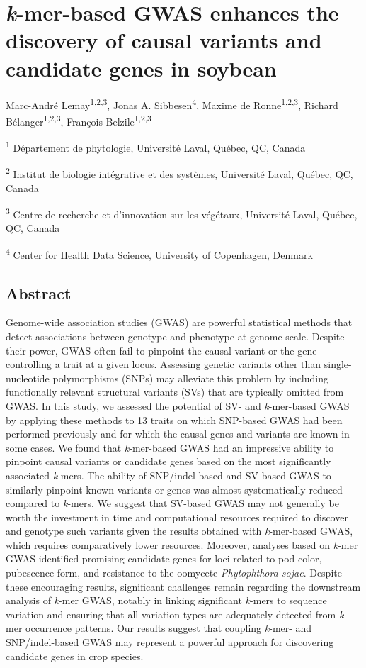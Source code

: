 \chapter{\textit{k}-mer-based GWAS enhances the discovery of causal variants and candidate genes in soybean}
\label{kmer-gwas}

Marc-André Lemay\textsuperscript{1,2,3},
Jonas A. Sibbesen\textsuperscript{4},
Maxime de Ronne\textsuperscript{1,2,3},
Richard Bélanger\textsuperscript{1,2,3},
François Belzile\textsuperscript{1,2,3}

\textsuperscript{1} Département de phytologie, Université Laval, Québec, QC, Canada

\textsuperscript{2} Institut de biologie intégrative et des systèmes, Université Laval, Québec, QC, Canada

\textsuperscript{3} Centre de recherche et d’innovation sur les végétaux, Université Laval, Québec, QC, Canada

\textsuperscript{4} Center for Health Data Science, University of Copenhagen, Denmark

\clearpage

\section{Abstract}

Genome-wide association studies (GWAS) are powerful statistical methods
that detect associations between genotype and phenotype at genome scale. Despite
their power, GWAS often fail to pinpoint the causal variant or the gene
controlling a trait at a given locus.  Assessing genetic variants other
than single-nucleotide polymorphisms (SNPs) may alleviate this problem
by including functionally relevant structural variants (SVs) that are
typically omitted from GWAS.  In this study, we assessed the potential
of SV- and \emph{k}-mer-based GWAS by applying these methods to 13
traits on which SNP-based GWAS had been performed previously and for
which the causal genes and variants are known in some cases. We found
that \emph{k}-mer-based GWAS had an impressive ability to pinpoint
causal variants or candidate genes based on the most significantly
associated \emph{k}-mers. The ability of SNP/indel-based and SV-based
GWAS to similarly pinpoint known variants or genes was almost
systematically reduced compared to \emph{k}-mers.  We suggest that
SV-based GWAS may not generally be worth the investment in time and
computational resources required to discover and genotype such variants
given the results obtained with \emph{k}-mer-based GWAS, which requires
comparatively lower resources.  Moreover, analyses based on
\emph{k}-mer GWAS identified promising candidate genes for loci related
to pod color, pubescence form, and resistance to the oomycete
\textit{Phytophthora sojae}.  Despite these encouraging results,
significant challenges remain regarding the downstream analysis of
\emph{k}-mer GWAS, notably in linking significant \emph{k}-mers to
sequence variation and ensuring that all variation types are adequately
detected from \emph{k}-mer occurrence patterns.  Our results suggest
that coupling \emph{k}-mer- and SNP/indel-based GWAS may represent a
powerful approach for discovering candidate genes in crop species.

